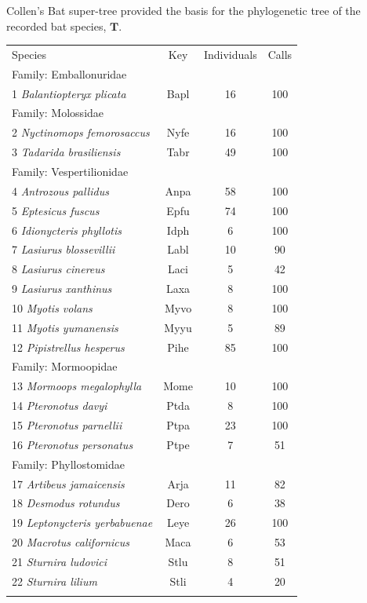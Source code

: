 \documentclass{ws-rv9x6}
\begin{document}
Collen's \cite{collen2012evolution} Bat super-tree provided the basis for the phylogenetic tree of the recorded bat species, \(\mathbf{T}\). 

\begin{table}[ht]
	{\begin{tabular}{@{}lccc@{}} \toprule
			Species & Key & Individuals & Calls \\ \colrule
			Family: Emballonuridae &&& \\
			1 \textit{Balantiopteryx plicata} & Bapl & 16 & 100 \\
			\colrule
			Family: Molossidae &&& \\
			2 \textit{Nyctinomops femorosaccus} & Nyfe & 16 & 100 \\
			3 \textit{Tadarida brasiliensis} & Tabr & 49 & 100  \\
			\colrule
			Family: Vespertilionidae &&& \\
			4 \textit{Antrozous pallidus} & Anpa & 58 & 100 \\
			5 \textit{Eptesicus fuscus} & Epfu & 74 & 100 \\
			6 \textit{Idionycteris phyllotis} & Idph & 6 & 100 \\
			7 \textit{Lasiurus blossevillii} & Labl & 10 & 90 \\
			8 \textit{Lasiurus cinereus} & Laci & 5 & 42 \\
			9 \textit{Lasiurus xanthinus} & Laxa & 8 & 100 \\
			10 \textit{Myotis volans} & Myvo & 8 & 100 \\
			11 \textit{Myotis yumanensis} & Myyu & 5 & 89 \\
			12 \textit{Pipistrellus hesperus} & Pihe & 85 & 100 \\
			\colrule
			Family: Mormoopidae &&& \\
			13 \textit{Mormoops megalophylla} & Mome & 10 & 100 \\
			14 \textit{Pteronotus davyi} & Ptda & 8 & 100 \\
			15 \textit{Pteronotus parnellii} & Ptpa & 23 & 100 \\
			16 \textit{Pteronotus personatus} & Ptpe & 7 & 51 \\
			\colrule
			Family: Phyllostomidae &&& \\
			17 \textit{Artibeus jamaicensis} & Arja & 11 & 82 \\
			18 \textit{Desmodus rotundus} & Dero & 6 & 38 \\
			19 \textit{Leptonycteris yerbabuenae} & Leye & 26 & 100 \\
			20 \textit{Macrotus californicus} & Maca & 6 & 53 \\
			21 \textit{Sturnira ludovici} & Stlu & 8 & 51 \\
			22 \textit{Sturnira lilium} & Stli & 4 & 20 \\
			\botrule
		\end{tabular}
	}
	\label{tab::dataset}
\end{table}
\end{document}
